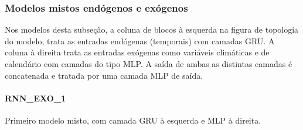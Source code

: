             
    	    \subsubsection{Modelos mistos endógenos e exógenos}
    	    Nos modelos desta subseção, a coluna de blocos à esquerda na figura de topologia do modelo, trata as entradas endógenas (temporais) com camadas GRU. A coluna à direita trata as entradas exógenas como variáveis climáticas e de calendário com camadas do tipo MLP.
    	    A saída de ambas as distintas camadas é concatenada e tratada por uma camada MLP de saída.
              \paragraph{RNN\_EXO\_1} Primeiro modelo misto, com camada GRU à esquerda e MLP à direita.
                \begin{figure}[H]
                \end{figure}

